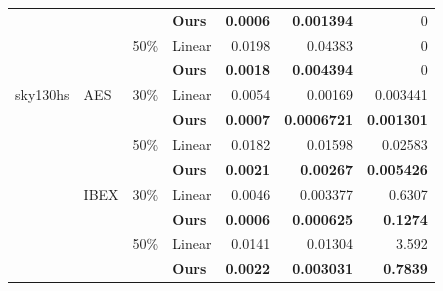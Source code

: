 \begin{tabular*}{\linewidth}{@{\extracolsep{\fill}}llllrrr@{}}
 &  &  & \textbf{Ours} & \textbf{0.0006} & \textbf{0.001394} & 0 \\
 &  & 50\% & Linear & 0.0198 & 0.04383 & 0 \\
 &  &  & \textbf{Ours} & \textbf{0.0018} & \textbf{0.004394} & 0 \\
\midrule
sky130hs & AES & 30\% & Linear & 0.0054 & 0.00169 & 0.003441 \\
 &  &  & \textbf{Ours} & \textbf{0.0007} & \textbf{0.0006721} & \textbf{0.001301} \\
 &  & 50\% & Linear & 0.0182 & 0.01598 & 0.02583 \\
 &  &  & \textbf{Ours} & \textbf{0.0021} & \textbf{0.00267} & \textbf{0.005426} \\
 & IBEX & 30\% & Linear & 0.0046 & 0.003377 & 0.6307 \\
 &  &  & \textbf{Ours} & \textbf{0.0006} & \textbf{0.000625} & \textbf{0.1274} \\
 &  & 50\% & Linear & 0.0141 & 0.01304 & 3.592 \\
 &  &  & \textbf{Ours} & \textbf{0.0022} & \textbf{0.003031} & \textbf{0.7839} \\
\bottomrule\end{tabular*}
